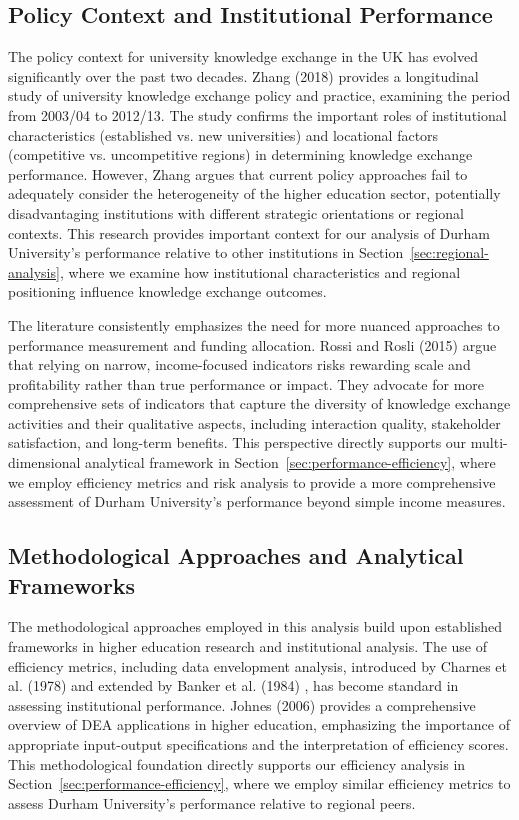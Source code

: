 \documentclass[journal,onecolumn, 10pt,draftclsnofoot]{IEEEtran}
\begin{document}
\subsection{Policy Context and Institutional Performance}

The policy context for university knowledge exchange in the UK has evolved significantly over the past two decades. Zhang (2018) \cite{zhang2018theory} provides a longitudinal study of university knowledge exchange policy and practice, examining the period from 2003/04 to 2012/13. The study confirms the important roles of institutional characteristics (established vs. new universities) and locational factors (competitive vs. uncompetitive regions) in determining knowledge exchange performance. However, Zhang argues that current policy approaches fail to adequately consider the heterogeneity of the higher education sector, potentially disadvantaging institutions with different strategic orientations or regional contexts. This research provides important context for our analysis of Durham University's performance relative to other institutions in Section~\ref{sec:regional-analysis}, where we examine how institutional characteristics and regional positioning influence knowledge exchange outcomes.

The literature consistently emphasizes the need for more nuanced approaches to performance measurement and funding allocation. Rossi and Rosli (2015) \cite{rossi2015indicators} argue that relying on narrow, income-focused indicators risks rewarding scale and profitability rather than true performance or impact. They advocate for more comprehensive sets of indicators that capture the diversity of knowledge exchange activities and their qualitative aspects, including interaction quality, stakeholder satisfaction, and long-term benefits. This perspective directly supports our multi-dimensional analytical framework in Section~\ref{sec:performance-efficiency}, where we employ efficiency metrics and risk analysis to provide a more comprehensive assessment of Durham University's performance beyond simple income measures.

\subsection{Methodological Approaches and Analytical Frameworks}

The methodological approaches employed in this analysis build upon established frameworks in higher education research and institutional analysis. The use of efficiency metrics, including data envelopment analysis, introduced by Charnes et al. (1978) \cite{charnes1978measuring} and extended by Banker et al. (1984) \cite{banker1984models}, has become standard in assessing institutional performance. Johnes (2006) \cite{johnes2006data} provides a comprehensive overview of DEA applications in higher education, emphasizing the importance of appropriate input-output specifications and the interpretation of efficiency scores. This methodological foundation directly supports our efficiency analysis in Section~\ref{sec:performance-efficiency}, where we employ similar efficiency metrics to assess Durham University's performance relative to regional peers.
\end{document}
